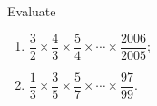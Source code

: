 Evaluate
\begin{enumerate}
\item[(a)] $\dfrac{3}{2}\times\dfrac{4}{3}\times\dfrac{5}{4}\times\cdots\times\dfrac{2006}{2005}$;
\item[(b)] $\dfrac{1}{3}\times\dfrac{3}{5}\times\dfrac{5}{7}\times\cdots\times\dfrac{97}{99}$.
\end{enumerate}
